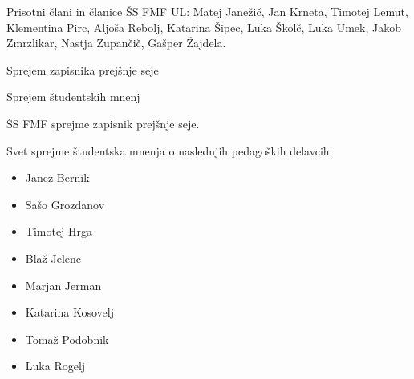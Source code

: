 \documentclass{seja}
\begin{document}
Prisotni člani in članice ŠS FMF UL:
Matej Janežič,
Jan Krneta,
Timotej Lemut,
Klementina Pirc,
Aljoša Rebolj,
Katarina Šipec,
Luka Školč,
Luka Umek,
Jakob Zmrzlikar,
Nastja Zupančič,
Gašper Žajdela.

\begin{red}
	\item
	Sprejem zapisnika prejšnje seje
    \item
    Sprejem študentskih mnenj

\end{red}

\begin{ad}
    \item
    \begin{sklep*}
        ŠS FMF sprejme zapisnik prejšnje seje.
    \end{sklep*}
    
    \item
    \begin{sklep*}
    Svet sprejme študentska mnenja o naslednjih pedagoških delavcih:
    \begin{itemize}
        \item Janez Bernik
        \item Sašo Grozdanov
        \item Timotej Hrga
        \item Blaž Jelenc
        \item Marjan Jerman
        \item Katarina Kosovelj
        \item Tomaž Podobnik
        \item Luka Rogelj
    \end{itemize}
    \end{sklep*}
\end{ad}

\makeatletter \global\let\@enddocumenthook\@empty \makeatother
{}
\end{document}
